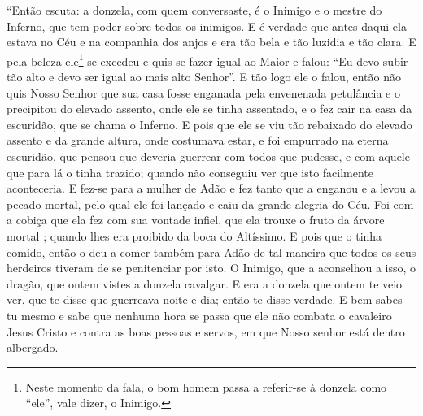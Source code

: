 “Então escuta: a donzela, com quem conversaste, é o Inimigo e o mestre do
Inferno, que tem poder sobre todos os inimigos. E é verdade que antes daqui ela
estava no Céu e na companhia dos anjos e era tão bela e tão luzidia e tão
clara. E pela beleza ele\footnote{ Neste momento da fala, o bom homem passa a
referir-se à donzela como “ele”, vale dizer, o Inimigo.}  se
excedeu e quis se fazer igual ao Maior e falou: “Eu devo subir tão alto e devo
ser igual ao mais alto Senhor”. E tão logo ele o falou, então não quis Nosso
Senhor que sua casa fosse enganada pela envenenada petulância e o precipitou do
elevado assento, onde ele se tinha assentado, e o fez cair na casa da
escuridão, que se chama o Inferno. E pois que ele se viu tão rebaixado do
elevado assento e da grande altura, onde costumava estar, e foi empurrado na
eterna escuridão, que pensou que deveria guerrear com todos que pudesse, e com
aquele que para lá o tinha trazido; quando não conseguiu ver que isto
facilmente aconteceria. E fez-se para a mulher de Adão e fez tanto que a
enganou e a levou a pecado mortal, pelo qual ele foi lançado e caiu da grande
alegria do Céu. Foi com a cobiça que ela fez com sua vontade infiel, que ela
trouxe o fruto da árvore mortal ; quando lhes era proibido da boca do
Altíssimo. E pois que o tinha comido, então o deu a comer também para Adão de
tal maneira que todos os seus herdeiros tiveram de se penitenciar por isto. O
Inimigo, que a aconselhou a isso, o dragão, que ontem vistes a donzela
cavalgar. E era a donzela que ontem te veio ver, que te disse que guerreava
noite e dia; então te disse verdade. E bem sabes tu mesmo e sabe que nenhuma
hora se passa que ele não combata o cavaleiro Jesus Cristo e contra as boas
pessoas e servos, em que Nosso senhor está dentro albergado. 

